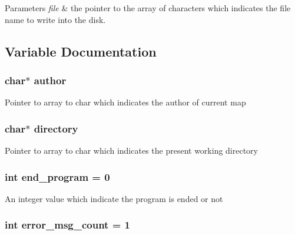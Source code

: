 \begin{DoxyParams}{Parameters}
{\em file} & the pointer to the array of characters which indicates the file name to write into the disk. \\
\hline
\end{DoxyParams}


\subsection{Variable Documentation}
\hypertarget{pacman-level-editor_8c_a70d51dcba75e5d70d4708c7885550468}{
\subsubsection[{author}]{\setlength{\rightskip}{0pt plus 5cm}char$\ast$ author}}\label{pacman-level-editor_8c_a70d51dcba75e5d70d4708c7885550468}
Pointer to array to char which indicates the author of current map \hypertarget{pacman-level-editor_8c_a8eadc6730ef4fbdae87a20414b789faf}{
\subsubsection[{directory}]{\setlength{\rightskip}{0pt plus 5cm}char$\ast$ directory}}\label{pacman-level-editor_8c_a8eadc6730ef4fbdae87a20414b789faf}
Pointer to array to char which indicates the present working directory \hypertarget{pacman-level-editor_8c_a1bee207ff2415ab72a1e22c86a93f100}{
\subsubsection[{end\-\_\-program}]{\setlength{\rightskip}{0pt plus 5cm}int end\-\_\-program = 0}}\label{pacman-level-editor_8c_a1bee207ff2415ab72a1e22c86a93f100}
An integer value which indicate the program is ended or not \hypertarget{pacman-level-editor_8c_ae0ebb9a2dde9db7a8070d03799386e18}{
\subsubsection[{error\-\_\-msg\-\_\-count}]{\setlength{\rightskip}{0pt plus 5cm}int error\-\_\-msg\-\_\-count = 1}}\label{pacman-level-editor_8c_ae0ebb9a2dde9db7a8070d03799386e18}
